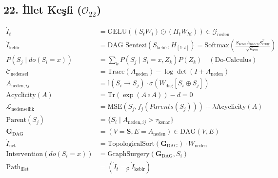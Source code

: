 \documentclass[11pt, a4paper]{article}
\begin{document}
\subsection{22. İllet Keşfi ($\mathcal{O}_{22}$)}
\begin{align}
\dot{I}_t &= \text{GELU}\left( (S_t W_i) \odot (H_t W_{hi}) \right) \in \mathcal{G}_{\text{neden}} \\
\dot{I}_{\text{kebîr}} &= \text{DAG\_Sentezi}(S_{\text{kebîr}}, H_{[1:t]}) = \text{Softmax}\left( \frac{S_{\text{kebîr}} A_{\text{neden}} S_{\text{kebîr}}^T}{\sqrt{d_{\text{sem}}}} \right) \\
P(S_j \mid do(S_i = x)) &= \sum_k P(S_j \mid S_i=x, Z_k) P(Z_k) \quad (\text{Do-Calculus}) \\
\mathcal{C}_{\text{nedensel}} &= \text{Trace}(A_{\text{neden}}) - \log \det(I + A_{\text{neden}}) \\
A_{\text{neden}, ij} &= \mathbb{I}(S_i \to S_j) \cdot \sigma(W_{\text{dag}} [S_i \oplus S_j]) \\
\text{Acyclicity}(A) &= \text{Tr}(\exp(A \circ A)) - d = 0 \\
\mathcal{L}_{\text{nedensellik}} &= \text{MSE}(S_j, f_j(Parents(S_j))) + \lambda \text{Acyclicity}(A) \\
\text{Parent}(S_j) &= \{ S_i \mid A_{\text{neden}, ij} > \tau_{\text{kenar}} \} \\
\mathbf{G}_{\text{DAG}} &= (V=\mathbf{S}, E=A_{\text{neden}}) \in \text{DAG}(V, E) \\
\dot{I}_{\text{net}} &= \text{TopologicalSort}(\mathbf{G}_{\text{DAG}}) \cdot W_{\text{neden}} \\
\text{Intervention}(do(S_i=x)) &= \text{GraphSurgery}(\mathbf{G}_{\text{DAG}}, S_i) \\
\text{Path}_{\text{illet}} &= (\dot{I}_t =_{\mathcal{G}} \dot{I}_{\text{kebîr}})
\end{align}
\end{document}

